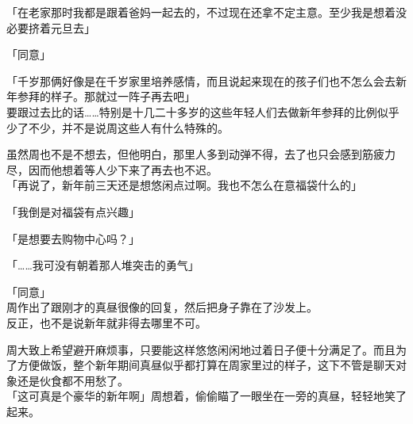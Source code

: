 「在老家那时我都是跟着爸妈一起去的，不过现在还拿不定主意。至少我是想着没必要挤着元旦去」

「同意」

「千岁那俩好像是在千岁家里培养感情，而且说起来现在的孩子们也不怎么会去新年参拜的样子。那就过一阵子再去吧」\\

要跟过去比的话……特别是十几二十多岁的这些年轻人们去做新年参拜的比例似乎少了不少，并不是说周这些人有什么特殊的。

虽然周也不是不想去，但他明白，那里人多到动弹不得，去了也只会感到筋疲力尽，因而他想着等人少下来了再去也不迟。\\

「再说了，新年前三天还是想悠闲点过啊。我也不怎么在意福袋什么的」

「我倒是对福袋有点兴趣」

「是想要去购物中心吗？」

「……我可没有朝着那人堆突击的勇气」

「同意」\\

周作出了跟刚才的真昼很像的回复，然后把身子靠在了沙发上。\\

反正，也不是说新年就非得去哪里不可。

周大致上希望避开麻烦事，只要能这样悠悠闲闲地过着日子便十分满足了。而且为了方便做饭，整个新年期间真昼似乎都打算在周家里过的样子，这下不管是聊天对象还是伙食都不用愁了。\\

「这可真是个豪华的新年啊」周想着，偷偷瞄了一眼坐在一旁的真昼，轻轻地笑了起来。
